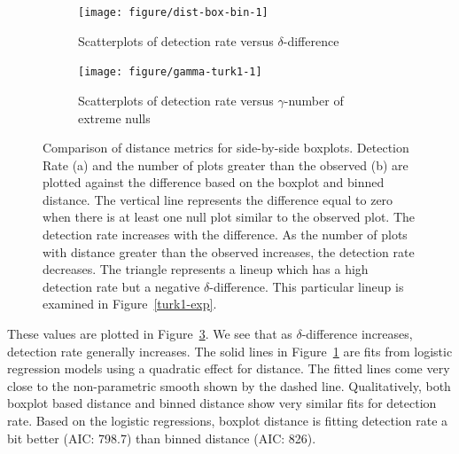 \documentclass[12pt]{article}\usepackage[]{graphicx}\usepackage[]{color}
\newenvironment{knitrout}{}{} %
\begin{document}
\begin{figure}[!t]
\centering
\begin{subfigure}[t]{\textwidth}
\centering
\caption{\label{fig:turkcomp-1}Scatterplots of detection rate versus $\delta$-difference}
\begin{knitrout}
\color{fgcolor}
\texttt{[image: figure/dist-box-bin-1]} 

\end{knitrout}
\end{subfigure}
\begin{subfigure}[t]{\textwidth}
\centering
\caption{\label{fig:turk1comp-2}Scatterplots of detection rate versus $\gamma$-number of extreme nulls}
\begin{knitrout}
\color{fgcolor}
\texttt{[image: figure/gamma-turk1-1]} 

\end{knitrout}
\end{subfigure}
	\vspace{-.1in}
\caption{Comparison of distance metrics for side-by-side boxplots. Detection Rate (a) and the number of plots greater than the observed (b) are plotted against the difference based on the boxplot and binned distance. The vertical line represents the difference equal to zero when there is at least one null plot similar to the observed plot. The detection rate increases with the difference. As the number of plots with distance greater than the observed increases, the detection rate decreases.  The triangle represents a lineup which has a high detection rate but a negative $\delta$-difference. This particular lineup is examined in Figure~\ref{turk1-exp}. }
\label{turk1comp}
\end{figure}

These values are plotted in Figure~\ref{turk1comp}.
We see that as $\delta$-difference increases, detection rate generally increases. The solid lines in Figure~\ref{fig:turkcomp-1} are fits  from  logistic regression models using a quadratic effect for distance.
The fitted lines come very close to the non-parametric smooth shown by the dashed line. Qualitatively, both boxplot based distance and binned distance show very similar fits for detection rate. Based on the logistic regressions, boxplot distance is fitting detection rate a bit better (AIC: 798.7) than binned distance  (AIC: 826). 
\end{document}
